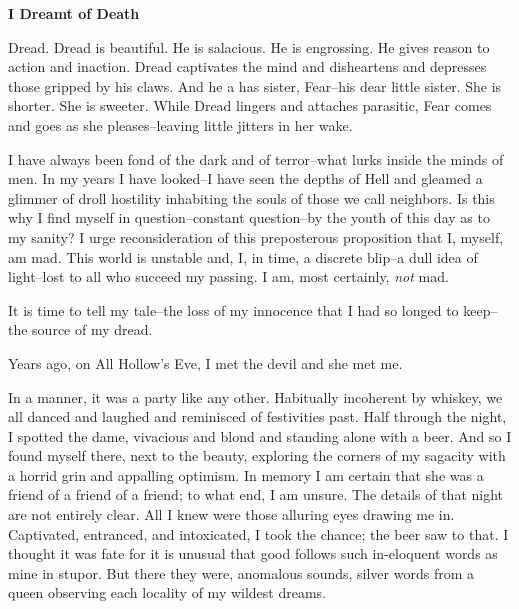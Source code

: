 \documentclass{article}
\begin{document}


\begin{center}
\large\textbf{I Dreamt of Death}
\end{center}



\noindent
Dread.
Dread is beautiful.  He is salacious.  He is engrossing.
He gives reason to action and inaction.
Dread captivates the mind and disheartens and depresses
those gripped by his claws.
And he a has sister, Fear--his dear little sister.
She is shorter.  She is sweeter.
While Dread lingers and attaches parasitic,
Fear comes and goes as she pleases--leaving
little jitters in her wake.


I have always been fond of the dark and of terror--what
lurks inside the minds of men. In my years
I have looked--I have seen the depths of Hell
and gleamed a glimmer of droll hostility
inhabiting the souls of those we call neighbors.
Is this why I find myself in question--constant question--by
the youth of this day as to my sanity?
I urge reconsideration of this preposterous proposition that
I, myself, am mad.
This world is unstable and, I, in time, a discrete blip--a
dull idea of light--lost to all who succeed my passing.
I am, most certainly, \textit{not} mad.
\VV


\noindent %
It is time to tell my tale--the
loss of my innocence that I had so longed to keep--the
source of my dread.
\VV


\noindent
Years ago, on All Hollow's Eve,
I met the devil and she met me.
\VV


\noindent
In a manner, it was a party like any other.
Habitually incoherent by whiskey,
we all danced and laughed and reminisced of festivities past.
Half through the night, I spotted the dame,
vivacious and blond and standing alone with a beer.
And so I found myself there, next to the beauty,
exploring the corners of my sagacity with a horrid
grin and appalling optimism.
In memory I am certain that she was a friend of
a friend of a friend; to what end, I am unsure.
The details of that night are not entirely clear.
All I knew were those alluring eyes drawing me in.
Captivated, entranced, and intoxicated,
I took the chance; the beer saw to that.
I thought it was fate for it is unusual
that good follows such in-eloquent words
as mine in stupor.
But there they were, anomalous sounds,
silver words from a queen observing each
locality of my wildest dreams.
\end{document}
